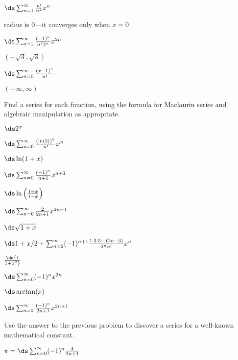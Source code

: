 \begin{exercises}
\exercise $\ds\sum_{n=1}^\infty {n!\over n^2} x^n$
\begin{answer} radius is $0$---it converges only when $x=0$
\end{answer}

\exercise $\ds\sum_{n=1}^\infty {(-1)^n\over n^2 3^n} x^{2n}$
\begin{answer} $(-\sqrt3,\sqrt3)$
\end{answer}

\exercise $\ds\sum_{n=0}^\infty {(x-1)^n\over n!}$
\begin{answer} $(-\infty,\infty)$
\end{answer}

\msk\noindent
Find a series for each function, using the formula for Maclaurin
series and algebraic manipulation as appropriate.

\exercise $\ds 2^x$
\begin{answer} $\ds\sum_{n=0}^\infty {(\ln(2))^n\over n!}x^n$
\end{answer}

\exercise $\ds \ln(1+x)$
\begin{answer} $\ds\sum_{n=0}^\infty {(-1)^n\over n+1}x^{n+1}$
\end{answer}

\exercise $\ds \ln\left({1+x\over 1-x}\right)$
\begin{answer} $\ds \sum_{n=0}^\infty {2\over 2n+1}x^{2n+1}$
\end{answer}

\exercise $\ds \sqrt{1+x}$
\begin{answer} $\ds 1+ x/2+\sum_{n=2}^\infty (-1)^{n+1}
{1\cdot3\cdot5\cdots(2n-3)\over2^n n!}x^n$
\end{answer}

\exercise $\ds {1\over 1+x^2}$
\begin{answer} $\ds \sum_{n=0}^\infty (-1)^n x^{2n}$
\end{answer}

\exercise $\ds \arctan(x)$
\begin{answer} $\ds \sum_{n=0}^\infty {(-1)^n\over 2n+1} x^{2n+1}$
\end{answer}

\exercise Use the answer to the previous problem to discover a series
for a well-known mathematical constant.
\begin{answer} $\pi = \ds \sum_{n=0}^\infty (-1)^n{4\over 2n+1}$
\end{answer}

\end{exercises}
